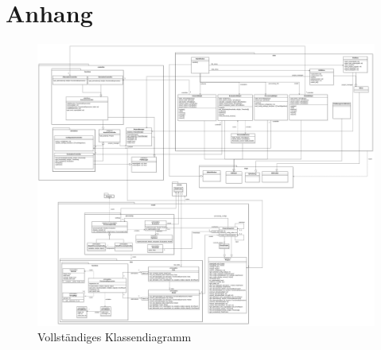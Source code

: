 \documentclass{article}
\begin{document}
\section{Anhang}
\begin{figure}[H]%
    \centering
    \includegraphics[width=13cm]{entwurf/Entwurf_dokument/img/KlassendiagrammAlles.png}
    \caption{Vollständiges Klassendiagramm}
\end{figure}



\printglossary
\end{document}
